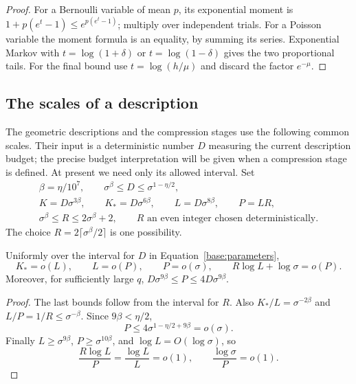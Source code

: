 \begin{proof}
For a Bernoulli variable of mean $p$, its exponential moment is
$1+p(e^t-1)\le e^{p(e^t-1)}$; multiply over independent trials.
For a Poisson variable the moment formula is an equality, by summing
its series. Exponential Markov with $t=\log(1+\delta)$ or
$t=\log(1-\delta)$ gives the two proportional tails. For the final
bound use $t=\log(h/\mu)$ and discard the factor $e^{-\mu}$.
\end{proof}

\subsection{The scales of a description}

The geometric descriptions and the compression stages use the following
common scales. Their input is a deterministic number $D$ measuring the
current description budget; the precise budget interpretation will be
given when a compression stage is defined. At present we need only its
allowed interval. Set
\begin{equation}
\begin{gathered}
 \beta=\eta/10^7,\qquad
 \sigma^\beta\le D\le\sigma^{1-\eta/2},\\
 K=D\sigma^{3\beta},\qquad K_*=D\sigma^{6\beta},\qquad
 L=D\sigma^{8\beta},\qquad P=LR,\\
 \sigma^\beta\le R\le2\sigma^\beta+2,
 \qquad R\text{ an even integer chosen deterministically}.
\end{gathered}
\label{base:parameters}
\end{equation}
The choice $R=2\lceil\sigma^\beta/2\rceil$ is one possibility.

\begin{lemma}
\label{base:scale-comparisons}
Uniformly over the interval for $D$ in Equation~\eqref{base:parameters},
\[
 K_*=o(L),\qquad L=o(P),\qquad P=o(\sigma),\qquad
 R\log L+\log\sigma=o(P).
\]
Moreover, for sufficiently large $q$,
$D\sigma^{9\beta}\le P\le4D\sigma^{9\beta}$.
\end{lemma}

\begin{proof}
The last bounds follow from the interval for $R$.
Also $K_*/L=\sigma^{-2\beta}$ and $L/P=1/R\le\sigma^{-\beta}$.
Since $9\beta<\eta/2$,
\[
 P\le4\sigma^{1-\eta/2+9\beta}=o(\sigma).
\]
Finally $L\ge\sigma^{9\beta}$, $P\ge\sigma^{10\beta}$, and
$\log L=O(\log\sigma)$, so
\[
 \frac{R\log L}{P}=\frac{\log L}{L}=o(1),
 \qquad \frac{\log\sigma}{P}=o(1).
\]
\end{proof}
